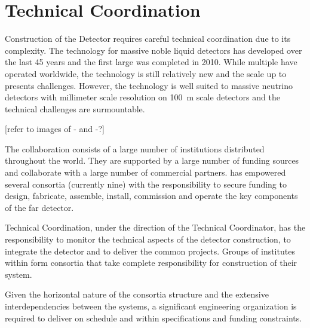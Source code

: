 \chapter{Technical Coordination}
\label{ch:fdsp-coord}

Construction of the  Detector requires careful technical
coordination due to its complexity. The technology for massive noble
liquid detectors has developed over the last \num{45} years and the first
large  was completed in
2010. While multiple  have operated worldwide, the technology
is still relatively new and the scale up to  presents
challenges. However, the technology is well suited to massive neutrino
detectors with millimeter scale resolution on \SI{100}{m} scale detectors and
the technical challenges are surmountable.

[refer to images of - and -?]

The  collaboration consists of a large number of
institutions distributed throughout the world. They are supported by a
large number of funding sources and collaborate with a large number of
commercial partners.  has empowered several consortia
(currently nine) with the responsibility to secure funding to design,
fabricate, assemble, install, commission and operate the key
components of the  far detector.

 Technical Coordination, under the direction of the
 Technical Coordinator, has the responsibility to monitor
the technical aspects of the detector construction, to integrate the
detector and to deliver the common projects. Groups of institutes
within  form consortia that take complete responsibility
for construction of their system.

Given the horizontal nature of the consortia structure and the
extensive interdependencies between the systems, a significant
engineering organization is required to deliver  on
schedule and within specifications and funding constraints.

